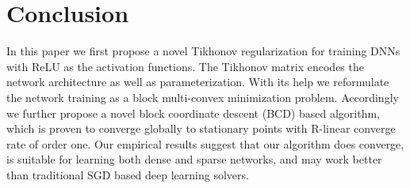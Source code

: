 \documentclass{article}
\begin{document}
    
\section{Conclusion}
In this paper we first propose a novel Tikhonov regularization for training DNNs with ReLU as the activation functions. The Tikhonov matrix encodes the network architecture as well as parameterization. With its help we reformulate the network training as a block multi-convex minimization problem. Accordingly we further propose a novel block coordinate descent (BCD) based algorithm, which is proven to converge globally to stationary points with R-linear converge rate of order one. Our empirical results suggest that our algorithm does converge, is suitable for learning both dense and sparse networks, and may work better than traditional SGD based deep learning solvers. 
    
	
\newpage{\small


}  
	
\end{document}
